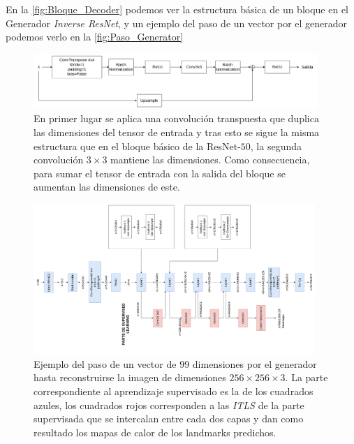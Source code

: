             \medskip

            \noindent En la \autoref{fig:Bloque_Decoder} podemos ver la estructura básica de un bloque en el Generador \textit{Inverse ResNet}, y un ejemplo del paso de un vector por el generador podemos verlo en la \autoref{fig:Paso_Generator}

            \begin{figure}[!h]
                \centering
                \includegraphics[width=0.96\textwidth]{img/bloque_invresnet.png}
                \caption{En primer lugar se aplica una convolución transpuesta que duplica las dimensiones del tensor de entrada y tras esto se sigue la misma estructura que en el bloque básico de la ResNet-$50$, la segunda convolución $3\times 3$ mantiene las dimensiones. Como consecuencia, para sumar el tensor de entrada con la salida del bloque se aumentan las dimensiones de este.}
                \label{fig:Bloque_Decoder}
            \end{figure}

            \begin{figure}[!h]
                \centering
                \includegraphics[width=0.95\textwidth]{img/paso_generator.png}
                \caption{Ejemplo del paso de un vector de $99$ dimensiones por el generador hasta reconstruirse la imagen de dimensiones $256 \times 256 \times 3$. La parte correspondiente al aprendizaje supervisado es la de los cuadrados azules, los cuadrados rojos corresponden a las \textit{ITLS} de la parte supervisada que se intercalan entre cada dos capas y dan como resultado los mapas de calor de los landmarks predichos.}
                \label{fig:Paso_Generator}
            \end{figure}

